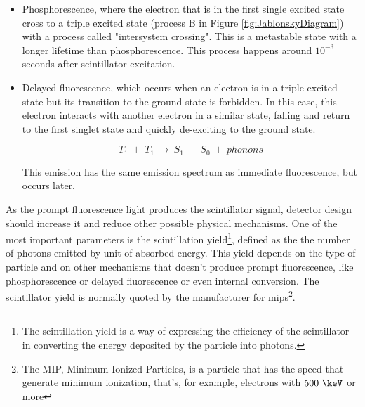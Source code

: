 \begin{itemize}
\item{} Phosphorescence, where the electron that is in the first single excited state cross to a triple excited state (process B in Figure \ref{fig:JablonskyDiagram}) with a process called "intersystem crossing". This is a metastable state with a longer lifetime than phosphorescence. This process happens around $10^{-3}$ seconds after scintillator excitation.

\item{} Delayed fluorescence, which occurs when an electron is in a triple excited state but its transition to the ground state is forbidden. In this case, this electron interacts with another electron in a similar state, falling and return to the first singlet state and quickly de-exciting to the ground state. 

\begin{equation}
T_{1} ~+~ T_{1}~ \longrightarrow ~ S_{1} ~+~ S_{0} ~+~ phonons
\label{eq:DelayFluorescence}
\end{equation}

This emission has the same emission spectrum as immediate fluorescence, but occurs later.
\end{itemize}

As the prompt fluorescence light produces the scintillator signal, detector design should increase it and reduce other possible physical mechanisms. One of the most important parameters is the scintillation yield\footnote{The scintillation yield is a way of expressing the efficiency of the scintillator in converting the energy deposited by the particle into photons.}, defined as the the number of photons emitted by unit of absorbed energy. This yield depends on the type of particle and on other mechanisms that doesn't produce prompt fluorescence, like phosphorescence or delayed fluorescence or even internal conversion. The scintillator yield is normally quoted by the manufacturer for mips\footnote{The MIP, Minimum Ionized Particles, is a particle that has the speed that generate minimum ionization, that's, for example, electrons with $500~\keV$ or more}.
